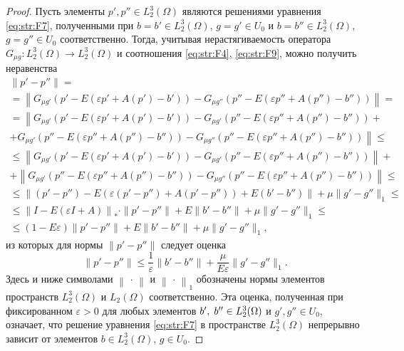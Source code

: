 \begin{proof}
Пусть элементы $p',  p''\in L_{2}^{3} (\Omega)$ являются решениями уравнения \eqref{eq:str:F7}, полученными при $b=b'\in L_{2}^{3} (\Omega)$, $g=g'\in U_{0} $ и $b=b''\in L_{2}^{3} (\Omega)$, $g=g''\in U_{0} $ соответственно.
Тогда, учитывая нерастягиваемость оператора $G_{\mu g} \colon L_{2}^{3} (\Omega)\to L_{2}^{3} (\Omega)$ и соотношения \eqref{eq:str:F4}, \eqref{eq:str:F9}, можно получить неравенства
\begin{multline*} 
\left\| p'-p''\right\| = 
\\  
=\left\| G_{\mu g'} \left(p'-E\left(\varepsilon   p'+A(p')-b'\right)\right)-G_{\mu g''} \left(p''-E\left(\varepsilon  p''+  A(p'')-b''\right)\right)\right\| 
=
\\
=\left\| G_{\mu g'} \left(p'-E\left(\varepsilon  p'+A(p')-b'\right)\right) -G_{\mu g'} \left(p''-E\left(\varepsilon  p''+ A(p'')-b''\right)\right)+
\right.\\ \left.
+
G_{\mu g'} \left(p'' -E\left(\varepsilon  p''+A(p'')-b''\right)\right)-G_{\mu g''} \left(p''-E\left(\varepsilon  p''+A(p'')-b''\right)\right)\right\|
\le 
\\
\le \left\| G_{\mu g'} \left(p'-E\left(\varepsilon  p'+A(p')-b'\right)\right)-G_{\mu g'} \left(p''-E\left(\varepsilon  p''+ A(p'')-b''\right)\right)\right\| +
\\ 
  +\left\| G_{\mu g'} \left(p''-E\left(\varepsilon  p''+A(p'')-b''\right)\right) -G_{\mu g''} \left(p''-E\left(\varepsilon  p''  +A(p'')-b''\right)\right)\right\| \le 
\\
\le \left\| (p'-p'') -E\left(\varepsilon  (p'-p'')+A(p'-p'')\right) +E(b'-b'')\right\| + \mu \| g'-g''\| _{1} \le 
\\   
\le \left\| I-E\left(\varepsilon I+A\right)\right\| _{*} \cdot \| p'-p''\| +E \| b'-b''\| + \mu \| g'-g''\| _{1} \le 
\\
\le   ( 1-E\varepsilon ) \| p'-p''\| +E \| b'-b''\| +\mu \| g'-g''\| _{1} , 
      \end{multline*}
из которых для нормы $\| p'-p'' \| $ 
следует оценка 
$$
\| p'-p''\| \le \frac{1}{\varepsilon } \| b'-b''\| +\frac{\mu }{E\varepsilon } \| g'-g''\| _{1}.$$
Здесь и ниже символами $\left\|  \, \cdot  \, \right\| $ и $\left\|  \,\cdot  \,\right\| _{1} $ обозначены нормы элементов пространств $L_{2}^{3} (\Omega)$ и $L_{2} (\Omega)$ соответственно.
Эта оценка, полученная при фиксированном $\varepsilon >0$ для любых элементов $b',{\rm \; }b''\in L_{2}^{3} (\Omega)$ и $g',g''\in U_{0} $, означает, что решение уравнения \eqref{eq:str:F7} в пространстве $L_{2}^{3} (\Omega)$ непрерывно зависит от элементов $b\in L_{2}^{3} (\Omega)$, $g\in U_{0} $.
\end{proof}

